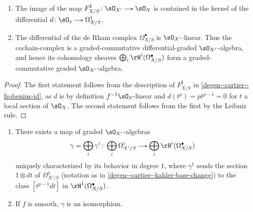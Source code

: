 \begin{lemma}
  \label{degen--cartier-linear}
  \begin{enumerate}[leftmargin=*]
  \item The image of the map $F_{X/S}^\sharp \c \sO_{X'} \to \sO_X$ is contained in the kernel of the differential $d \c \sO_x \to \Omega_{X/S}^1$.
  \item The differential of the de Rham complex $\Omega_{X/S}^\bullet$ is $\sO_{X'}$-linear. Thus the cochain-complex is a graded-commutative differential-graded $\sO_{X'}$-algebra, and hence its cohomology sheaves $\bigoplus_i \rH^i(\Omega_{X/S}^\bullet)$ form a graded-commutative graded $\sO_{X'}$-algebra.
  \end{enumerate}
\end{lemma}

\begin{proof}
  The first statement follows from the description of $F_{X/S}^\sharp$ in   \cref{degen--cartier--frobenius-id}, as $d$ is by definition $f^{-1}\sO_S$-linear and $d(t^p) = pt^{p-1} = 0$ for $t$ a local section of $\sO_X$. The second statement follows from the first by the Leibniz rule.
\end{proof}

\begin{theorem}
  \label{degen--cartier--main}
  \begin{enumerate}[leftmargin=*]
  \item There exists a map of graded $\sO_{X'}$-algebras
    \[
      \gamma = \bigoplus_i \gamma^i \c \bigoplus_i \Omega^i_{X'/S} \to \bigoplus_i \rH^i(\Omega_{X/S}^\bullet)
    \]
    uniquely characterized by its behavior in degree $1$, where $\gamma^1$ sends the section $1 \otimes dt$ of $\Omega^1_{X'/S}$ (notation as in \cref{degen--cartier--kahler-base-change}) to the class $[t^{p-1}dt]$ in $\rH^1(\Omega_{X/S}^\bullet)$.
  \item If $f$ is smooth, $\gamma$ is an isomorphism.
\end{enumerate}
\end{theorem}


